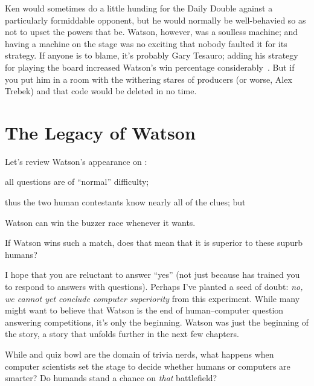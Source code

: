Ken would sometimes do a little hunding for the Daily Double against a
particularly formiddable opponent, but he would normally be
well-behavied so as not to upset the powers that be.
%
Watson, however, was a soulless machine; and having a machine on the
stage was no exciting that
nobody faulted it for its strategy.
%
If anyone is to blame, it's probably Gary Tesauro; adding his
strategy for playing the board increased Watson's win percentage
considerably~\citep{tesauro-13}.
%
But if you put him in a room with the withering stares of \jeopardy{}
producers (or worse, Alex Trebek) and that code would be deleted in no
time.


\section{The Legacy of Watson}


Let's review Watson's appearance on \jeopardyp{}:
\begin{enumerate*}
        \item all questions are of ``normal'' difficulty;
        \item thus the two human contestants know nearly all of the clues; but
        \item Watson can win the buzzer race whenever it wants.
\end{enumerate*}
If Watson wins such a match, does that mean that it is superior to
these supurb humans?

I hope that you are reluctant to answer ``yes'' (not just
because \jeopardy{} has trained you to respond to answers with
questions).
%
Perhaps I've planted a seed of doubt: \emph{no, we cannot yet conclude
  computer superiority} from this experiment.
%
While many might want to believe that Watson is the end of
human--computer question answering competitions, it's only the
beginning.
%
Watson was just the beginning of the story, a story that unfolds
further in the next few chapters.

While \jeopardy{} and quiz bowl are the domain of trivia nerds, what
happens when computer scientists set the stage to decide whether
humans or computers are smarter?
%
Do humands stand a chance on \emph{that} battlefield?
